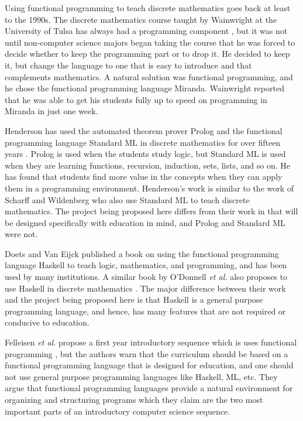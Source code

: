 Using functional programming to teach discrete mathematics goes back
at least to the 1990s.  The discrete mathematics course taught by
Wainwright at the University of Tulsa has always had a programming
component
\cite{Wainwright:1992}, but it was not until non-computer science
majors began taking the course that he was forced to decide whether to
keep the programming part or to drop it.  He decided to keep it, but
change the language to one that is easy to introduce and that
complements mathematics.  A natural solution was functional
programming, and he chose the functional programming language Miranda.
Wainwright reported that he was able to get his students fully up to
speed on programming in Miranda in just one week.

Henderson has used the automated theorem prover Prolog and the
functional programming language Standard ML in discrete mathematics
for over fifteen years \cite{Henderson:2002}.  Prolog is used when the
students study logic, but Standard ML is used when they are learning
functions, recursion, induction, sets, lists, and so on.  He has found
that students find more value in the concepts when they can apply them
in a programming environment.  Henderson's work is similar to the work
of Scharff and Wildenberg \cite{Scharff:2002} who also use Standard ML
to teach discrete mathematics. The project being proposed here differs
from their work in that \thelang{} will be designed specifically with
education in mind, and Prolog and Standard ML were not.

Doets and Van Eijck published a book \cite{Doets:2004} on using the
functional programming language Haskell to teach logic, mathematics,
and programming, and has been used by many institutions.  A similar
book by O'Donnell \emph{et al.} also proposes to use Haskell in discrete
mathematics \cite{ODonnell:2006}. The major difference between
their work and the project being proposed here is that Haskell is a
general purpose programming language, and hence, has many features
that are not required or conducive to education.

Felleisen \emph{et al.} propose a first year introductory sequence
which is uses functional programming
\cite{FELLEISEN_FINDLER_FLATT_KRISHNAMURTHI_2004}, but the authors
warn that the curriculum should be based on a functional programming
language that is designed for education, and one should not use
general purpose programming languages like Haskell, ML, etc.  They
argue that functional programming languages provide a natural
environment for organizing and structuring programs which they claim
are the two most important parts of an introductory computer science
sequence.

